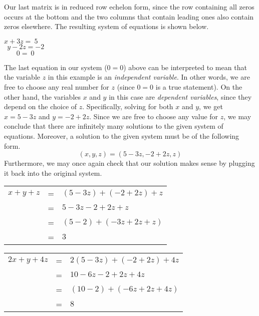Our last matrix is in reduced row echelon form, since the row containing all zeros occurs at the bottom and the two columns that contain leading ones also contain zeros elsewhere.  The resulting system of equations is shown below.
\begin{center}
$x+3z=~5$\\
$~~y-2z=-2$\\
$~~~~~~~~0=~0$
\end{center}
The last equation in our system ($0=0$) above can be interpreted to mean that the variable $z$ in this example is an \textit{independent variable}.  In other words, we are free to choose any real number for $z$ (since $0=0$ is a true statement).  On the other hand, the variables $x$ and $y$ in this case are \textit{dependent variables}, since they depend on the choice of $z$.  Specifically, solving for both $x$ and $y$, we get $x=5-3z$ and $y=-2+2z$.  Since we are free to choose any value for $z$, we may conclude that there are infinitely many solutions to the given system of equations.  Moreover, a solution to the given system must be of the following form.
$$(x,y,z)=(5-3z,-2+2z,z)$$
Furthermore, we may once again check that our solution makes sense by plugging it back into the original system.%

\begin{center}
\begin{tabular}{ccl}
$x+y+z$&=&$(5-3z)+(-2+2z)+z$\\
&=&$5-3z-2+2z+z$\\
&=&$(5-2)+(-3z+2z+z)$\\
&=&$3$%
\end{tabular}
\end{center}

\begin{center}
\begin{tabular}{ccl}
$2x+y+4z$&=&$2(5-3z)+(-2+2z)+4z$\\
&=&$10-6z-2+2z+4z$\\
&=&$(10-2)+(-6z+2z+4z)$\\
&=&$8$%
\end{tabular}
\end{center}

